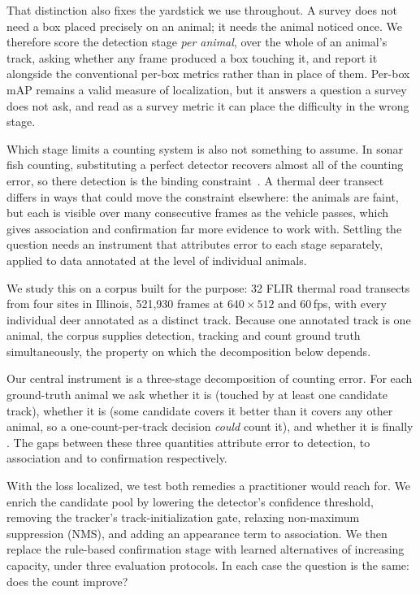 That distinction also fixes the yardstick we use throughout. A survey does not need a box
placed precisely on an animal; it needs the animal noticed once. We therefore score the
detection stage \emph{per animal}, over the whole of an animal's track, asking whether any
frame produced a box touching it, and report it alongside the conventional per-box metrics
rather than in place of them. Per-box mAP remains a valid measure of localization, but it
answers a question a survey does not ask, and read as a survey metric it can place the
difficulty in the wrong stage.

Which stage limits a counting system is also not something to assume. In sonar fish counting,
substituting a perfect detector recovers almost all of the counting error, so there detection
is the binding constraint~\cite{kay2022caltech}. A thermal deer transect differs in ways that
could move the constraint elsewhere: the animals are faint, but each is visible over many
consecutive frames as the vehicle passes, which gives association and confirmation far more
evidence to work with. Settling the question needs an instrument that attributes error to each
stage separately, applied to data annotated at the level of individual animals.

We study this on a corpus built for the purpose: 32 FLIR thermal road transects from four
sites in Illinois, 521,930 frames at $640\times512$ and 60\,fps, with every individual deer
annotated as a distinct track. Because one annotated track is one animal, the corpus supplies
detection, tracking and count ground truth simultaneously, the property on which the
decomposition below depends.

Our central instrument is a three-stage decomposition of counting error. For each
ground-truth animal we ask whether it is \reachedq (touched by at least one candidate track),
whether it is \primaryq (some candidate covers it better than it covers any other animal, so a
one-count-per-track decision \emph{could} count it), and whether it is finally \countedq. The
gaps between these three quantities attribute error to detection, to association and to
confirmation respectively.

With the loss localized, we test both remedies a practitioner would reach for. We enrich the candidate pool by lowering the detector's confidence threshold,
removing the tracker's track-initialization gate, relaxing non-maximum suppression (NMS), and
adding an appearance term to association. We then replace the rule-based confirmation stage
with learned alternatives of increasing capacity, under three evaluation protocols. In each
case the question is the same: does the count improve?

